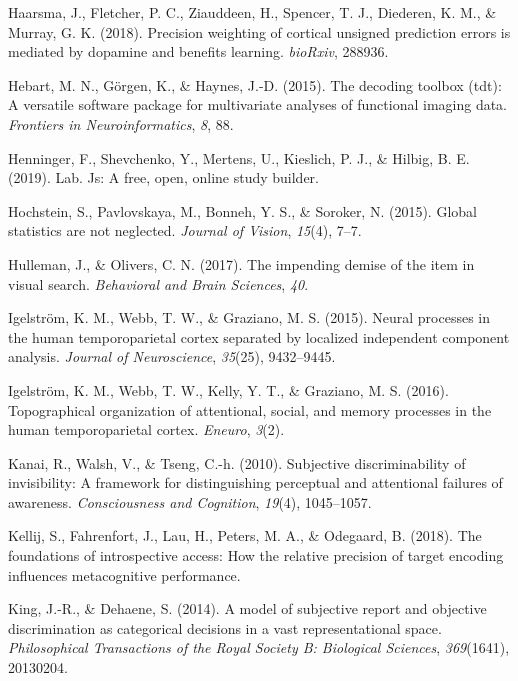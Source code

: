 \documentclass[12pt,twoside]{reedthesis}
\begin{document}
\leavevmode\hypertarget{ref-haarsma2018precision}{}%
Haarsma, J., Fletcher, P. C., Ziauddeen, H., Spencer, T. J., Diederen, K. M., \& Murray, G. K. (2018). Precision weighting of cortical unsigned prediction errors is mediated by dopamine and benefits learning. \emph{bioRxiv}, 288936.

\leavevmode\hypertarget{ref-hebart2015decoding}{}%
Hebart, M. N., Görgen, K., \& Haynes, J.-D. (2015). The decoding toolbox (tdt): A versatile software package for multivariate analyses of functional imaging data. \emph{Frontiers in Neuroinformatics}, \emph{8}, 88.

\leavevmode\hypertarget{ref-henninger2019lab}{}%
Henninger, F., Shevchenko, Y., Mertens, U., Kieslich, P. J., \& Hilbig, B. E. (2019). Lab. Js: A free, open, online study builder.

\leavevmode\hypertarget{ref-hochstein2015global}{}%
Hochstein, S., Pavlovskaya, M., Bonneh, Y. S., \& Soroker, N. (2015). Global statistics are not neglected. \emph{Journal of Vision}, \emph{15}(4), 7--7.

\leavevmode\hypertarget{ref-hulleman2017impending}{}%
Hulleman, J., \& Olivers, C. N. (2017). The impending demise of the item in visual search. \emph{Behavioral and Brain Sciences}, \emph{40}.

\leavevmode\hypertarget{ref-igelstrom2015neural}{}%
Igelström, K. M., Webb, T. W., \& Graziano, M. S. (2015). Neural processes in the human temporoparietal cortex separated by localized independent component analysis. \emph{Journal of Neuroscience}, \emph{35}(25), 9432--9445.

\leavevmode\hypertarget{ref-igelstrom2016topographical}{}%
Igelström, K. M., Webb, T. W., Kelly, Y. T., \& Graziano, M. S. (2016). Topographical organization of attentional, social, and memory processes in the human temporoparietal cortex. \emph{Eneuro}, \emph{3}(2).

\leavevmode\hypertarget{ref-kanai2010subjective}{}%
Kanai, R., Walsh, V., \& Tseng, C.-h. (2010). Subjective discriminability of invisibility: A framework for distinguishing perceptual and attentional failures of awareness. \emph{Consciousness and Cognition}, \emph{19}(4), 1045--1057.

\leavevmode\hypertarget{ref-kellij2018foundations}{}%
Kellij, S., Fahrenfort, J., Lau, H., Peters, M. A., \& Odegaard, B. (2018). The foundations of introspective access: How the relative precision of target encoding influences metacognitive performance.

\leavevmode\hypertarget{ref-king2014model}{}%
King, J.-R., \& Dehaene, S. (2014). A model of subjective report and objective discrimination as categorical decisions in a vast representational space. \emph{Philosophical Transactions of the Royal Society B: Biological Sciences}, \emph{369}(1641), 20130204.
\end{document}
